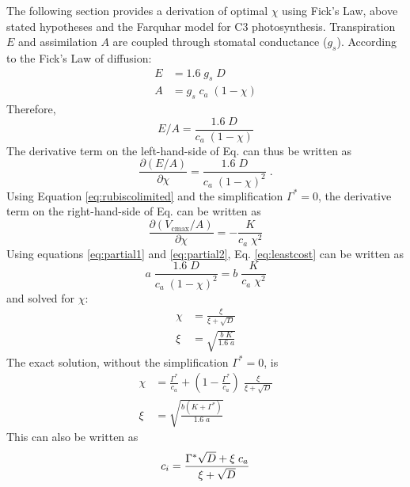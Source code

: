 \documentclass{myreport}
\begin{document}
The following section provides a derivation of optimal $\chi$ using Fick's Law, above stated hypotheses and the Farquhar model for C3 photosynthesis. 
Transpiration $E$ and assimilation $A$ are coupled through stomatal conductance ($g_s$).
According to the Fick's Law of diffusion:
\begin{align}
\label{eq:fick}
    E &= 1.6 \; g_s \; D \\
    A &= g_s \; c_a \; (1-\chi)
\end{align}
Therefore,
\begin{equation}
    E/A = \frac{1.6 \; D}{c_a\;(1-\chi)}
\end{equation}
The derivative term on the left-hand-side of Eq.\label{eq:leastcost} can thus be written as
\begin{equation}
\label{eq:partial1}
    \frac{\partial (E/A)}{\partial \chi} = \frac{1.6\;D}{c_a\;(1-\chi)^2}\;.
\end{equation}
Using Equation \ref{eq:rubiscolimited} and the simplification $\Gamma^{\ast}=0$, the derivative term on the right-hand-side of Eq.\label{eq:leastcost} can be written as
\begin{equation}
\label{eq:partial2}
    \frac{\partial (V_{\mathrm{cmax}}/A)}{\partial \chi} = - \frac{K}{c_a\;\chi^2}
\end{equation}
Using equations \ref{eq:partial1} and \ref{eq:partial2}, Eq. \ref{eq:leastcost} can be written as
\begin{equation}
    a\;\frac{1.6\;D}{c_a\;(1-\chi)^2} = b\;\frac{K}{c_a\;\chi^2}
\end{equation}
and solved for $\chi$:
\begin{align}
    \chi &= \frac{\xi}{\xi + \sqrt{D}} \\ 
    \xi &= \sqrt{\frac{b\;K}{1.6\;a}}
\end{align}
The exact solution, without the simplification $\Gamma^{\ast}=0$, is 
\begin{align}
\label{eq:chi_exact}
    \chi &= \frac{\Gamma^{\ast}}{c_a} + \left(1- \frac{\Gamma^{\ast}}{c_a}\right)\;\frac{\xi}{\xi + \sqrt{D}}\\
    \xi &= \sqrt{\frac{b(K+\Gamma^{\ast})}{1.6\;a}}
\end{align}
This can also be written as
\begin{equation}
\label{eq:ci}
    c_i = \frac{\Gamma^{\ast}\sqrt{D}+ \xi\;c_a}{\xi + \sqrt{D}} \\ 
\end{equation}
\end{document}
